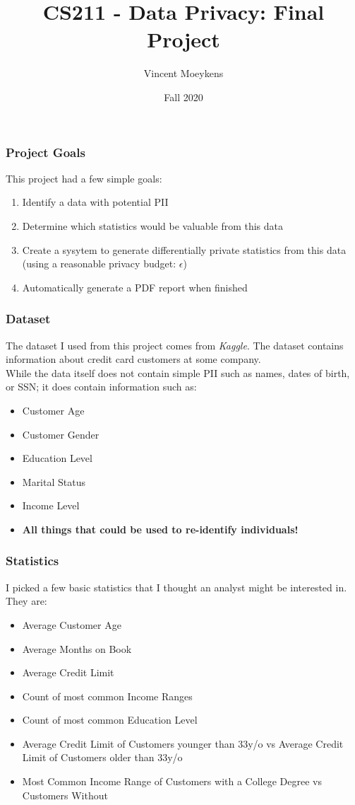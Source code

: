 \documentclass{beamer}
\title{CS211 - Data Privacy: Final Project}
\author{Vincent Moeykens}
\institute{The University of Vermont}
\date{Fall 2020}
\begin{document}
\frame{\titlepage}

\begin{frame}
\frametitle{Project Goals}
This project had a few simple goals:
\begin{enumerate}
\item Identify a data with potential PII
\item Determine which statistics would be valuable from this data
\item Create a sysytem to generate differentially private statistics from this data (using a reasonable privacy budget: $\epsilon$)
\item Automatically generate a PDF report when finished
\end{enumerate}
\end{frame}

\begin{frame}
\frametitle{Dataset}
The dataset I used from this project comes from \textit{Kaggle}. The dataset contains information about credit card customers at some company. \\

While the data itself does not contain simple PII such as names, dates of birth, or SSN; it does contain information such as:
\begin{itemize}
 \item<1-> Customer Age
 \item<2-> Customer Gender
 \item<3-> Education Level
 \item<4-> Marital Status
 \item<5-> Income Level
 \item<6-> \textbf{All things that could be used to re-identify individuals!}
\end{itemize}
\end{frame}

\begin{frame}
\frametitle{Statistics}
I picked a few basic statistics that I thought an analyst might be interested in. They are: 
\begin{itemize}
\item Average Customer Age
\item Average Months on Book
\item Average Credit Limit
\item Count of most common Income Ranges
\item Count of most common Education Level
\item Average Credit Limit of Customers younger than 33y/o vs Average Credit Limit of Customers older than 33y/o
\item Most Common Income Range of Customers with a College Degree vs Customers Without
\end{itemize}
\end{frame}
\end{document}
